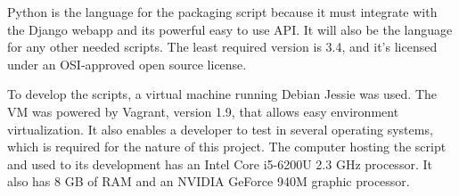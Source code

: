 Python is the language for the packaging script because it must integrate with the Django webapp and its powerful easy to use API. It will also be the language for any other needed scripts. The least required version is 3.4, and it's licensed under an OSI-approved open source license.

To develop the scripts, a virtual machine running Debian Jessie was used. The VM was powered by Vagrant, version 1.9, that allows easy environment virtualization. It also enables a developer to test in several operating systems, which is required for the nature of this project. The computer hosting the script and used to its development has an Intel Core i5-6200U 2.3 GHz processor. It also has 8 GB of RAM and an NVIDIA GeForce 940M graphic processor.
